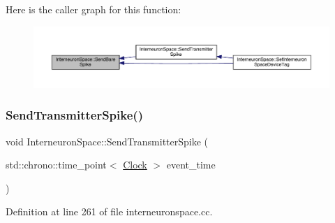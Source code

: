 Here is the caller graph for this function\+:\nopagebreak
\begin{figure}[H]
\begin{center}
\leavevmode
\includegraphics[width=350pt]{class_interneuron_space_ab56b0336c9e53f7b448e9d35e617e8c0_icgraph}
\end{center}
\end{figure}
\mbox{\label{class_interneuron_space_a0a24da715aecafd4072d596fc271666f}} 
\subsubsection{\texorpdfstring{Send\+Transmitter\+Spike()}{SendTransmitterSpike()}}
{\footnotesize\ttfamily void Interneuron\+Space\+::\+Send\+Transmitter\+Spike (\begin{DoxyParamCaption}\item[{std\+::chrono\+::time\+\_\+point$<$ \hyperlink{universe_8h_a0ef8d951d1ca5ab3cfaf7ab4c7a6fd80}{Clock} $>$}]{event\+\_\+time }\end{DoxyParamCaption})}



Definition at line 261 of file interneuronspace.\+cc.

